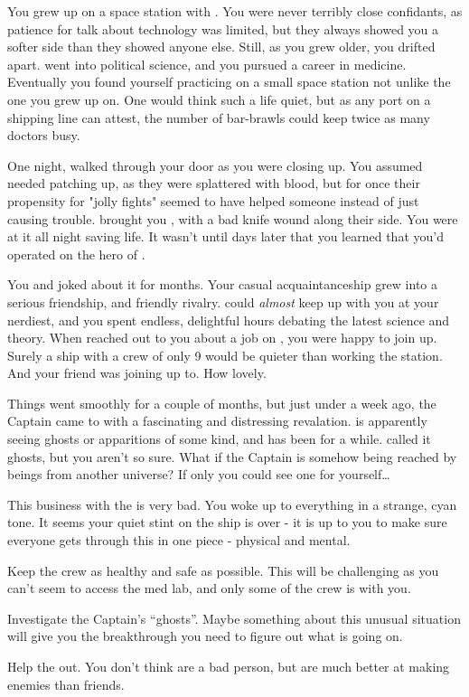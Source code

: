 \documentclass[char]{TMFHope}
\begin{document}
\name{\cMed{}}

You grew up on a space station with \cDip{}. You were never terribly close confidants, as \cDip{\their} patience for talk about technology was limited, but they always showed you a softer side than they showed anyone else. Still, as you grew older, you drifted apart. \cDip{} went into political science, and you pursued a career in medicine. Eventually you found yourself practicing on a small space station not unlike the one you grew up on. One would think such a life quiet, but as any port on a shipping line can attest, the number of bar-brawls could keep twice as many doctors busy.

One night, \cSci{} walked through your door as you were closing up. You assumed \cSci{\they} needed patching up, as they were splattered with blood, but for once their propensity for "jolly fights" seemed to have helped someone instead of just causing trouble. \cSci{\They} brought you \cCap{}, with a bad knife wound along their side. You were at it all night saving \cCap{\their} life. It wasn't until days later that you learned that you'd operated on the hero of \pBattle{}.

You and \cSci{} joked about it for months. Your casual acquaintanceship grew into a serious friendship, and friendly rivalry. \cSci{} could \emph{almost} keep up with you at your nerdiest, and you spent endless, delightful hours debating the latest science and theory. When \cCap{} reached out to you about a job on \pNew{}, you were happy to join up. Surely a ship with a crew of only 9 would be quieter than working the station. And your friend \cSci{} was joining up to. How lovely.

Things went smoothly for a couple of months, but just under a week ago, the Captain came to with a fascinating and distressing revalation. \cCap{} is apparently seeing ghosts or apparitions of some kind, and has been for a while. \cCap{\They} called it ghosts, but you aren't so sure. What if the Captain is somehow being reached by beings from another universe? If only you could see one for yourself\ldots

This business with the \pNew{} is very bad. You woke up to everything in a strange, cyan tone. It seems your quiet stint on the ship is over - it is up to you to make sure everyone gets through this in one piece - physical and mental.

\begin{itemz}[Goals]
	\item Keep the crew as healthy and safe as possible. This will be challenging as you can't seem to access the med lab, and only some of the crew is with you.
	\item Investigate the Captain's ``ghosts''. Maybe something about this unusual situation will give you the breakthrough you need to figure out what is going on.
	\item Help the \cDip{} out. You don't think \cDip{\they} are a bad person, but \cDip{\they} are much better at making enemies than friends.
\end{itemz}
\end{document}
